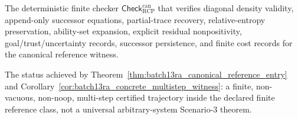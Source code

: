 \documentclass[11pt]{article}
\newcommand{\1}{\mathbf{1}}
\newcommand{\RCP}{\mathrm{RCP}}
\begin{document}
\begin{description}[leftmargin=2.7cm,style=nextline]
\item[Canonical RCP checker] The deterministic finite checker \(\mathsf{Check}_{\RCP}^{\mathrm{can}}\) that verifies diagonal density validity, append-only successor equations, partial-trace recovery, relative-entropy preservation, ability-set expansion, explicit residual nonpositivity, goal/trust/uncertainty records, successor persistence, and finite cost records for the canonical reference witness.
\item[Concrete finite restricted-Scenario-3 witness] The status achieved by Theorem~\ref{thm:batch13ra_canonical_reference_entry} and Corollary~\ref{cor:batch13ra_concrete_multistep_witness}: a finite, non-vacuous, non-noop, multi-step certified trajectory inside the declared finite reference class, not a universal arbitrary-system Scenario-3 theorem.

\end{description}
\end{document}
